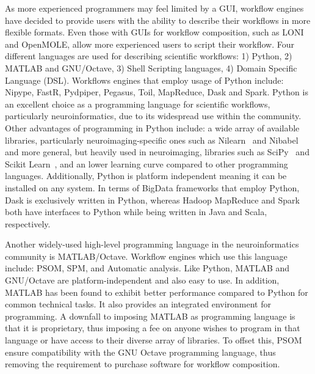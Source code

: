 \documentclass{report}
\begin{document}
            As more experienced programmers may feel limited by a GUI, workflow
            engines have decided to provide users with the ability to describe
            their workflows in more flexible formats. Even those with GUIs for 
            workflow composition, such as LONI and OpenMOLE, allow more 
            experienced users to script their workflow. Four different 
            languages are used for describing scientific workflows: 1) Python, 
            2) MATLAB and GNU/Octave, 3) Shell Scripting languages, 4) Domain Specific Language (DSL). Workflows engines that 
            employ usage of Python include: Nipype, FastR, Pydpiper, Pegasus, Toil,
            MapReduce, Dask and Spark.
            Python is an excellent choice as a programming language for 
            scientific workflows, particularly neuroinformatics, due to its 
            widespread use within the community. Other advantages of 
            programming in Python include: a wide array of available libraries,
            particularly neuroimaging-specific ones such as Nilearn~\cite{nilearn} and Nibabel~\cite{matthew_brett_2018_1287921}
            and more general, but heavily used in neuroimaging, libraries such
            as SciPy~\cite{scipy} and Scikit Learn~\cite{pedregosa2011scikit},
             and an lower learning curve compared to other 
            programming languages. Additionally, Python is platform independent
            meaning it can be installed on any system. In terms of BigData 
            frameworks that employ Python, Dask is exclusively written in Python,
            whereas Hadoop MapReduce and Spark both have interfaces to Python
            while being written in Java and Scala, respectively.

            Another widely-used high-level programming language in the 
            neuroinformatics community is MATLAB/Octave. Workflow engines which
            use this language include: PSOM, SPM, and Automatic analysis. Like 
            Python, MATLAB and GNU/Octave are platform-independent and also easy to use. In addition, MATLAB has 
            been found to exhibit better performance compared to Python for 
            common technical tasks. It also provides an integrated environment
            for programming. A 
            downfall to imposing MATLAB as programming language is that it is proprietary, thus imposing a fee on 
            anyone wishes to program in that language or have access to their diverse array of libraries. 
            To offset this, PSOM ensure compatibility with the GNU 
            Octave programming language, thus 
            removing the requirement to purchase software for workflow 
            composition. 
\end{document}
